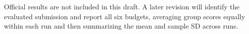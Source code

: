 Official results are not included in this draft. A later revision will identify the evaluated submission and report all six budgets, averaging group scores equally within each run and then summarizing the mean and sample SD across runs.
